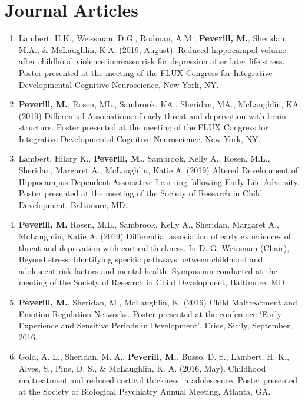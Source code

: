 \documentclass[12pt,letterpaper,roman]{moderncv}        %
\begin{document}
\section{Journal Articles}
\begin{enumerate}
	\item Lambert, H.K., Weissman, D.G., Rodman, A.M., \textbf{Peverill, M.}, Sheridan, M.A., \& McLaughlin, K.A. (2019, August). Reduced hippocampal volume after childhood violence increases risk for depression after later life stress. Poster presented at the meeting of the FLUX Congress for Integrative Developmental Cognitive Neuroscience, New York, NY.

	\item \textbf{Peverill, M.}, Rosen, ML., Sambrook, KA., Sheridan, MA., McLaughlin, KA. (2019) Differential Associations of early threat and deprivation with brain structure. Poster presented at the meeting of the FLUX Congress for Integrative Developmental Cognitive Neuroscience, New York, NY.

	\item Lambert, Hilary K., \textbf{Peverill, M.}, Sambrook, Kelly A., Rosen, M.L., Sheridan, Margaret A., McLaughlin, Katie A. (2019) Altered Development of Hippocampus-Dependent Associative Learning following Early-Life Adversity. Poster presented at the meeting of the Society of Research in Child Development, Baltimore, MD.

	\item \textbf{Peverill, M.} Rosen, M.L., Sambrook, Kelly A., Sheridan, Margaret A., McLaughlin, Katie A. (2019) Differential association of early experiences of threat and deprivation with cortical thickness. In D. G. Weissman (Chair), Beyond stress: Identifying specific pathways between childhood and adolescent risk factors and mental health. Symposium conducted at the meeting of the Society of Research in Child Development, Baltimore, MD.

	\item \textbf{Peverill, M.}, Sheridan, M., McLaughlin, K. (2016) Child Maltreatment and Emotion Regulation Networks. Poster presented at the conference ‘Early Experience and Sensitive Periods in Development’, Erice, Sicily, September, 2016.

	\item Gold, A. L., Sheridan, M. A., \textbf{Peverill, M.}, Busso, D. S., Lambert, H. K., Alves, S., Pine, D. S., \& McLaughlin, K. A. (2016, May). Childhood maltreatment and reduced cortical thickness in adolescence. Poster presented at the Society of Biological Psychiatry Annual Meeting, Atlanta, GA.


\end{enumerate}
\end{document}

